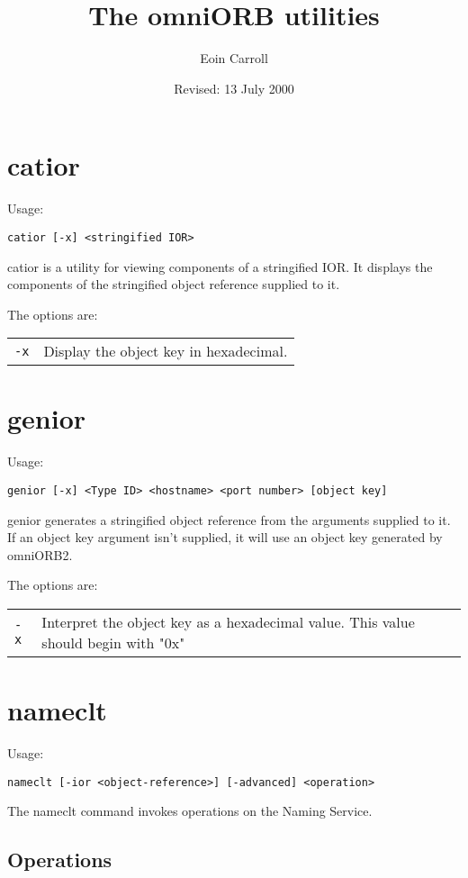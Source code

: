 \documentclass[11pt,twoside,onecolumn]{article}
\title{The omniORB utilities}
\author{Eoin Carroll}
\date{Revised: 13 July 2000}
\begin{document}
\maketitle

\section{catior}
Usage:
\begin{verbatim}
catior [-x] <stringified IOR>
\end{verbatim}

\noindent catior is a utility for viewing components of a stringified
IOR.  It displays the components of the stringified object reference
supplied to it.

The options are:


\begin{tabular}{ll}
\verb.-x.
  & Display the object key in hexadecimal.
\end{tabular}


\section{genior}
Usage: 
\begin{verbatim}
genior [-x] <Type ID> <hostname> <port number> [object key]
\end{verbatim}

\noindent genior generates a stringified object reference from the
arguments supplied to it.  If an object key argument isn't supplied,
it will use an object key generated by omniORB2.

The options are:


\begin{tabular}{lp{}}
\verb.-x.
 & Interpret the object key as a hexadecimal value. This 
value should begin with "0x"
\end{tabular}


\section{nameclt}
Usage: 
\begin{verbatim}
nameclt [-ior <object-reference>] [-advanced] <operation> 
\end{verbatim}

\noindent The nameclt command invokes operations on the Naming
Service.

\subsection{Operations}
\end{document}
